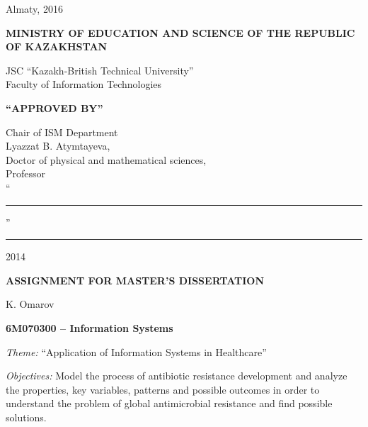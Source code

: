 \begin{titlepage}
\begin{center}
    \end{center}


    \begin{center}
        \vfill
        Almaty, 2016
    \end{center}

    \pagebreak


    \begin{center}
    {\bf{\MakeUppercase{Ministry of education and science of the republic of Kazakhstan}}

        \vspace{14pt}

        JSC ``Kazakh-British Technical University''\\
        Faculty of Information Technologies}

        \vspace{14pt}

        \begin{flushright}
            {\bf \MakeUppercase{``Approved by''}}

            Chair of ISM Department\\
            Lyazzat B. Atymtayeva,\\
            Doctor of physical and mathematical sciences,\\
            Professor\\

            \vspace{0.5\baselineskip}
            ``\rule{2em}{0.4pt}'' \rule{8em}{0.4pt} 2014\\
            \end{flushright}

        {\bf
        \MakeUppercase{Assignment for master's dissertation}}

    \end{center}

    \setlength{\parindent}{0pt}
    \setlength{\parskip}{1ex plus 0.5ex minus 0.2ex}

    K. Omarov

    {\bf 6M070300 -- Information Systems}

    \emph{Theme:} ``Application of Information Systems in Healthcare''

   \emph{Objectives:}
    Model the process of antibiotic resistance development and analyze the properties, key variables, patterns and possible outcomes in order to understand the problem of global antimicrobial resistance and find possible solutions.


\end{titlepage}
